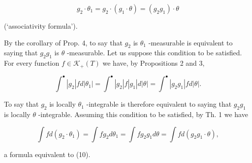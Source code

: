\[
g _ {2} \cdot \theta_ {1} = g _ {2} \cdot (g _ {1} \cdot \theta) = (g _ {2} g _ {1}) \cdot \theta\tag{10}
\]

(`associativity formula').

By the corollary of Prop. 4, to say that \(g_{2}\) is \(\theta_{1}\) -measurable is equivalent to saying that \(g_{2}g_{1}\) is \(\theta\) -measurable. Let us suppose this condition to be satisfied. For every function \(f \in \mathcal{K}_{+}(T)\) we have, by Propositions 2 and 3,

\[
\int^ {\bullet} | g _ {2} | f d | \theta_ {1} | = \int^ {\bullet} | g _ {2} | f | g _ {1} | d | \theta | = \int^ {\bullet} | g _ {2} g _ {1} | f d | \theta |.
\]

To say that \(g_{2}\) is locally \(\theta_{1}\) -integrable is therefore equivalent to saying that \(g_{2}g_{1}\) is locally \(\theta\) -integrable. Assuming this condition to be satisfied, by Th. 1 we have

\[
\int f d \left(g _ {2} \cdot \theta_ {1}\right) = \int f g _ {2} d \theta_ {1} = \int f g _ {2} g _ {1} d \theta = \int f d \left(g _ {2} g _ {1} \cdot \theta\right),
\]

a formula equivalent to (10).
